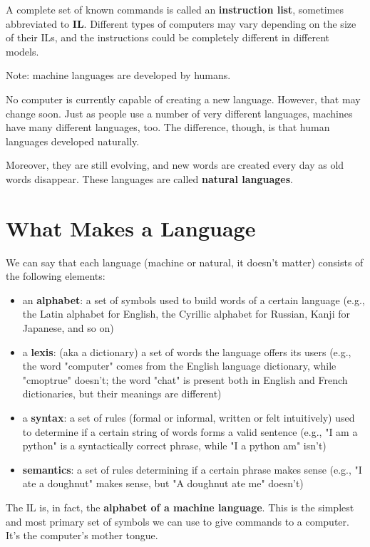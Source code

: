 \documentclass[a4paper,10pt]{article}
\begin{document}
A complete set of known commands is called an \textbf{instruction list}, sometimes abbreviated to \textbf{IL}. Different types of computers may vary depending on the size of their ILs, and the instructions could be completely different in different models.
\newline

Note: machine languages are developed by humans.
\newline

No computer is currently capable of creating a new language. However, that may change soon. Just as people use a number of very different languages, machines have many different languages, too. The difference, though, is that human languages developed naturally.
\newline

Moreover, they are still evolving, and new words are created every day as old words disappear. These languages are called \textbf{natural languages}.

\section{What Makes a Language}
We can say that each language (machine or natural, it doesn't matter) consists of the following elements:

\begin{itemize}
 \item an \textbf{alphabet}: a set of symbols used to build words of a certain language (e.g., the Latin alphabet for English, the Cyrillic alphabet for Russian, Kanji for Japanese, and so on)
  \item a \textbf{lexis}: (aka a dictionary) a set of words the language offers its users (e.g., the word "computer" comes from the English language dictionary, while "cmoptrue" doesn't; the word "chat" is present both in English and French dictionaries, but their meanings are different)
  \item a \textbf{syntax}: a set of rules (formal or informal, written or felt intuitively) used to determine if a certain string of words forms a valid sentence (e.g., "I am a python" is a syntactically correct phrase, while "I a python am" isn't)
  \item \textbf{semantics}: a set of rules determining if a certain phrase makes sense (e.g., "I ate a doughnut" makes sense, but "A doughnut ate me" doesn't)
\end{itemize}

The IL is, in fact, the \textbf{alphabet of a machine language}. This is the simplest and most primary set of symbols we can use to give commands to a computer. It's the computer's mother tongue.
\newline
\end{document}
